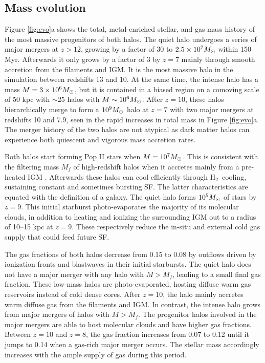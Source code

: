 \documentclass[12pt,preprint]{aastex}
\newcommand{\li}{\noindent$\bullet$\quad}
\newcommand{\Ms}{\ifmmode{M_\odot}\else{$M_\odot$}\fi}
\newcommand{\hh}{H$_2$}
\begin{document}
\subsection{Mass evolution}
\label{sec:halo}


Figure \ref{fig:evo}a shows the total, metal-enriched stellar, and gas
mass history of the most massive progenitors of both halos.  The quiet
halo undergoes a series of major mergers at $z > 12$, growing by a
factor of 30 to $2.5 \times 10^7 \Ms$ within 150 Myr.  Afterwards it
only grows by a factor of 3 by $z=7$ mainly through smooth accretion
from the filaments and IGM.  It is the most massive halo in the
simulation between redshifts 13 and 10.  At the same time, the intense
halo has a mass $M = 3 \times 10^6 \Ms$, but it is contained in a
biased region on a comoving scale of 50 kpc with $\sim25$ halos with
$M \sim 10^6 \Ms$.  After $z=10$, these halos hierarchically merge to
form a $10^9 \Ms$ halo at $z=7$ with two major mergers at redshifts 10
and 7.9, seen in the rapid increases in total mass in Figure
\ref{fig:evo}a.  The merger history of the two halos are not atypical
as dark matter halos can experience both quiescent and vigorous mass
accretion rates.

Both halos start forming Pop II stars when $M = 10^7 \Ms$.  This is
consistent with the filtering mass $M_f$ of high-redshift halos when
it accretes mainly from a pre-heated IGM \citep{gnedin98, gnedin00,
  Wise08_Gal}.  Afterwards these halos can cool efficiently through
\hh~cooling, sustaining constant and sometimes bursting SF.  The
latter characteristics are equated with the definition of a galaxy.
The quiet halo forms $10^5 \Ms$ of stars by $z=9$.  This initial
starburst photo-evaporates the majority of its molecular clouds, in
addition to heating and ionizing the surrounding IGM out to a radius
of 10--15 kpc at $z=9$.  These respectively reduce the in-situ and
external cold gas supply that could feed future SF.

The gas fractions of both halos decrease from 0.15 to 0.08 by outflows
driven by ionization fronts and blastwaves in their initial
starbursts.  The quiet halo does not have a major merger with any halo
with $M > M_f$, leading to a small final gas fraction.  These low-mass
halos are photo-evaporated, hosting diffuse warm gas reservoirs
instead of cold dense cores.  After $z=10$, the halo mainly accretes
warm diffuse gas from the filaments and IGM.  In contrast, the intense
halo grows from major mergers of halos with $M > M_f$.  The progenitor
halos involved in the major mergers are able to host molecular clouds
and have higher gas fractions.  Between $z=10$ and $z=8$, the gas
fraction increases from 0.07 to 0.12 until it jumps to 0.14 when a
gas-rich major merger occurs.  The stellar mass accordingly increases
with the ample supply of gas during this period.  
\end{document}
